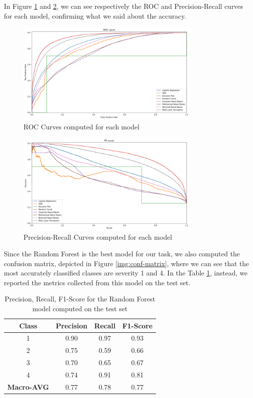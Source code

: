 \documentclass{article}
\begin{document}
In Figure \ref{img:roc-curve} and \ref{img:pr-curve}, we can see respectively the ROC and Precision-Recall curves for each model, confirming what we said about the accuracy.

\begin{figure}[h!]
\centering
\includegraphics[width=0.8\textwidth]{roc-curve}
\caption{ROC Curves computed for each model}
\label{img:roc-curve}
\end{figure}

\begin{figure}[h!]
\centering
\includegraphics[width=0.8\textwidth]{pr-curve}
\caption{Precision-Recall Curves computed for each model}
\label{img:pr-curve}
\end{figure}

Since the Random Forest is the best model for our task, we also computed the confusion matrix, depicted in Figure \ref{img:conf-matrix}, where we can see that the most accurately classified classes are severity 1 and 4. In the Table \ref{tab:random-forest-testset}, instead, we reported the metrics collected from this model on the test set.

\begin{table}[h!]
\center
\begin{tabular}{|c|c|c|c|}
\hline
\textbf{Class} & \textbf{Precision} & \textbf{Recall} & \textbf{F1-Score} \\
\hline
1 & 0.90 & 0.97 & 0.93 \\
\hline
2 & 0.75 & 0.59 & 0.66 \\
\hline
3 & 0.70 & 0.65 & 0.67 \\
\hline
4 & 0.74 & 0.91 & 0.81 \\
\hline
\hline
\textbf{Macro-AVG} & 0.77 & 0.78 & 0.77\\
\hline
\end{tabular}
\caption{Precision, Recall, F1-Score for the Random Forest model computed on the test set}
\label{tab:random-forest-testset}
\end{table}
\end{document}
